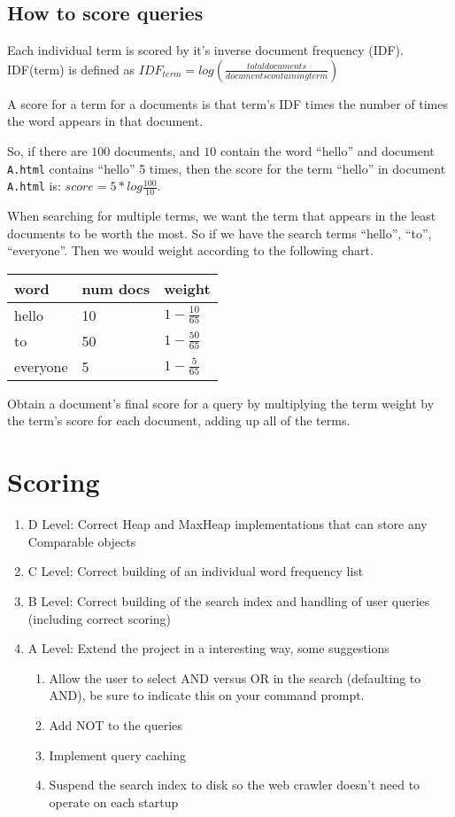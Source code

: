 \documentclass[10pt]{exam}
\begin{document}
\subsection{How to score queries}
Each individual term is scored by it's inverse document frequency (IDF).   IDF(term) is defined as $IDF_{term} = log ( \frac{ total documents}{documents containing term})$
\par
A score for a term for a documents is that term's IDF times the number of times the word appears in that document.
\par
So, if there are $100$ documents, and $10$ contain the word ``hello'' and document {\tt A.html} contains ``hello'' 5 times, then the score for the term ``hello'' in document {\tt A.html} is: $score = 5 * log{ \frac{100}{10} }$.
\par
When searching for multiple terms, we want the term that appears in the least documents to be worth the most.   So if we have the search terms ``hello'', ``to'', ``everyone''.  Then we would weight according to the following chart.

\begin{tabular}{lll}
	word & num docs & weight \\ \hline
	hello & 10 & $1 - \frac{10}{65}$ \\ 
	to & 50 & $1 - \frac{50}{65}$ \\
	everyone & 5 & $1 - \frac{5}{65}$ \\
\end{tabular}

\par
Obtain a document's final score for a query by multiplying the term weight by the term's score for each document, adding up all of the terms.

\section{Scoring}

\begin{enumerate}
	\item D Level: Correct Heap and MaxHeap implementations that can store any Comparable objects
	\item C Level: Correct building of an individual word frequency list
	\item B Level: Correct building of the search index and handling of user queries (including correct scoring)
	\item A Level: Extend the project in a interesting way, some suggestions
	\begin{enumerate}
		\item Allow the user to select AND versus OR in the search (defaulting to AND), be sure to indicate this on your command prompt.
		\item Add NOT to the queries
		\item Implement query caching
		\item Suspend the search index to disk so the web crawler doesn't need to operate on each startup
	\end{enumerate}
\end{enumerate}
\end{document}

